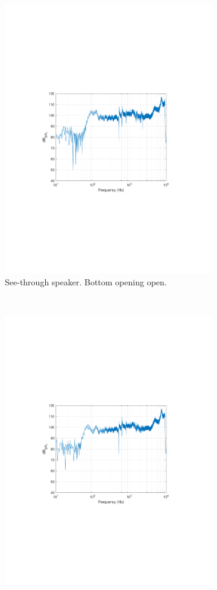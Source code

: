\begin{figure}
\begin{subfigure}{.5\textwidth}
		\includegraphics[width=.9\linewidth, clip, trim={3.9cm 8.4cm 4.5cm 9cm}]{gfx/SpeakerMeas/PGopen.pdf}
		\caption{See-through speaker. Bottom opening open.}
		\label{fig:measPGopen}
	\end{subfigure}
	\\
	\begin{subfigure}[t]{.5\textwidth}
		\centering
		\includegraphics[width=.9\linewidth, clip, trim={3.9cm 8.4cm 4.5cm 9cm}]{gfx/SpeakerMeas/PGBR.pdf}

\end{subfigure}
\end{figure}
